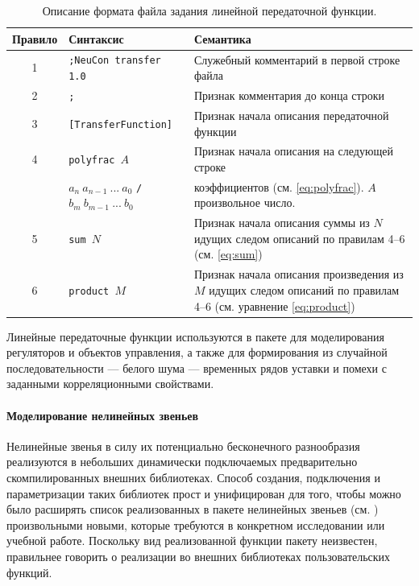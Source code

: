\begin{table}[ht]
\centering
\caption{Описание формата файла задания линейной передаточной функции.}
\label{tabl:tf_syntax}
\begin{tabular}{|c|l|p{9.5cm}|}
\hline
Правило & Синтаксис & Семантика \\
\hline
1 & \tt ;NeuCon transfer 1.0 & Служебный комментарий в первой строке файла \\
2 & \tt ;                    & Признак комментария до конца строки \\
3 & \tt [TransferFunction]   & Признак начала описания передаточной функции \\
4 & \tt polyfrac $A$           & Признак начала описания на следующей строке \\
  & $a_n\:a_{n-1}\:...\:a_0$ {\tt /} $b_m\:b_{m-1}\:...\:b_0$ & коэффициентов (см. \ref{eq:polyfrac}).  $A$ произвольное число. \\
5 & \tt sum $N$              & Признак начала описания суммы из $N$ идущих следом описаний по правилам 4--6 (см. \ref{eq:sum}) \\
6 & \tt product $M$          & Признак начала описания произведения из $M$ идущих следом описаний по правилам 4--6 (см. уравнение \ref{eq:product}) \\
\hline
\end{tabular}
\end{table}

Линейные передаточные функции используются в пакете для моделирования
регуляторов и объектов управления, а также для формирования из
случайной последовательности --- белого шума --- временных рядов
уставки и помехи с заданными корреляционными свойствами.

\paragraph{Моделирование нелинейных звеньев}

Нелинейные звенья в силу их потенциально бесконечного разнообразия
реализуются в небольших динамически подключаемых предварительно
скомпилированных внешних библиотеках.  Способ создания, подключения и
параметризации таких библиотек прост и унифицирован для того, чтобы
можно было расширять список реализованных в пакете нелинейных звеньев
(см. ) произвольными новыми, которые
требуются в конкретном исследовании или учебной работе.  Поскольку вид
реализованной функции пакету неизвестен, правильнее говорить о
реализации во внешних библиотеках пользовательских функций.

